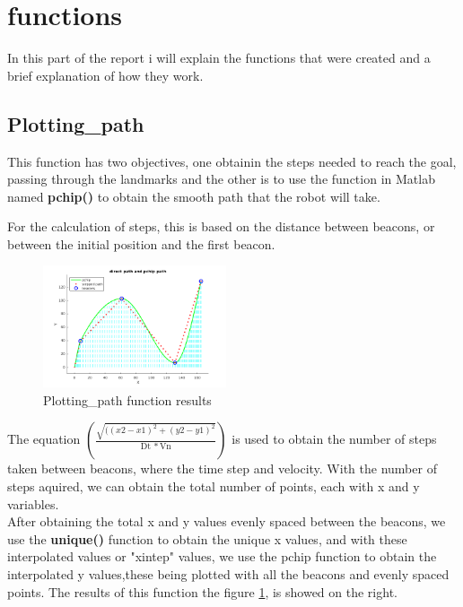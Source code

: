 \documentclass[runningheads]{llncs}
\begin{document}
\section{functions}
In this part of the report i will explain the functions that were created and a brief explanation of how they work.


\subsection*{Plotting\_path}
This function has two objectives, one obtainin the steps needed to reach the goal, passing through the landmarks 
and the other is to use the function in Matlab named \textbf{pchip()} to obtain the smooth path that the robot will take.

For the calculation of steps, this is based on the distance between beacons, or between the initial position and the first beacon.

\begin{figure}
    \centering
    \includegraphics[width=0.48\textwidth]{plotting_path.png}
    \caption{Plotting\_path function results}
    \label{plotting_path_fig}
\end{figure}

The equation \begin{math} \left(\frac{\sqrt{((x2-x1)^2+(y2-y1)^2}}{\mathrm{Dt}\, * \mathrm{Vn}}\right)
\end{math} is used to obtain the number of steps taken between beacons, where the time step and velocity.
With the number of steps aquired, we can obtain the total number of  points, each with x and y variables.
\\ 
After obtaining the total x and y values evenly spaced between the beacons, we use the \textbf{unique()} function to obtain the unique x values, 
and with these interpolated values or "xintep" values, we use the pchip function to obtain the interpolated y values,these being plotted with all the beacons and evenly spaced points.
The results of this function the figure \ref*{plotting_path_fig}, is showed on the right. 
\end{document}

